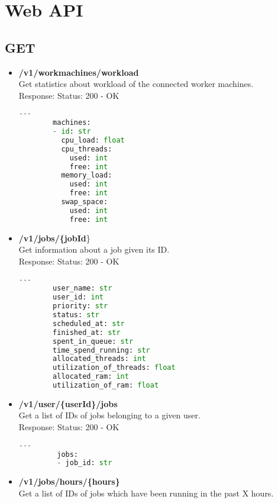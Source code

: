 \section{Web API}
  \subsection{GET}
    \begin{itemize}
      \item \textbf{/v1/workmachines/workload}\\
        Get statistics about workload of the connected worker machines.\\
        Response: Status: 200 - OK
        \begin{lstlisting}[language=Python, caption=Yaml response]
        ---
        machines:
        - id: str
          cpu_load: float
          cpu_threads:
            used: int
            free: int
          memory_load:
            used: int
            free: int
          swap_space:
            used: int
            free: int
        \end{lstlisting}
      \item \textbf{/v1/jobs/\{jobId}\}\\
       Get information about a job given its ID.\\
       Response: Status: 200 - OK
        \begin{lstlisting}[language=Python, caption=Yaml response]
        ---
        user_name: str
        user_id: int
        priority: str
        status: str
        scheduled_at: str
        finished_at: str
        spent_in_queue: str
        time_spend_running: str
        allocated_threads: int
        utilization_of_threads: float
        allocated_ram: int
        utilization_of_ram: float
        \end{lstlisting}
      \item \textbf{/v1/user/\{userId\}/jobs}\\
         Get a list of IDs of jobs belonging to a given user.\\
         Response: Status: 200 - OK
         \begin{lstlisting}[language=Python, caption=Yaml response]
         ---
         jobs:
         - job_id: str
         \end{lstlisting}
      \item \textbf{/v1/jobs/hours/\{hours\}}\\
         Get a list of IDs of jobs which have been running in the past X hours.\\

\end{itemize}
